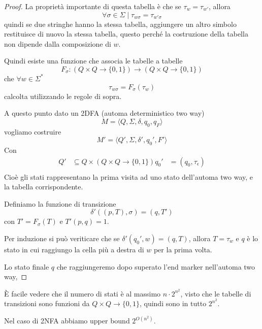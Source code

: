\documentclass[12pt]{article}
\begin{document}
\begin{proof}
	La proprietà importante di questa tabella è che se $\tau_w = \tau_{w'}$, allora
	$$\forall \sigma \in \Sigma \mid \tau_{w\sigma} = \tau_{w'\sigma} $$
	quindi se due stringhe hanno la stessa tabella, aggiungere un altro simbolo restituisce di nuovo la stessa tabella, questo perché la costruzione della tabella non dipende dalla composizione di $w$. %

	Quindi esiste una funzione che associa le tabelle a tabelle
	$$ F_\sigma : (Q \times Q \rightarrow \{0, 1\}) \rightarrow (Q \times Q \rightarrow \{0, 1\}) $$
	che $\forall w \in \Sigma^*$
	$$ \tau_{w\sigma} = F_\sigma(\tau_w) $$
	calcolta utilizzando le regole di sopra.

	A questo punto dato un 2DFA (automa deterministico two way)
	$$ M = \langle Q, \Sigma, \delta, q_0, q_F\rangle$$
	vogliamo costruire
	$$ M' = \langle Q', \Sigma, \delta', q_0', F' \rangle $$
	Con
	\begin{align*}
		Q' &\subseteq Q \times (Q \times Q \rightarrow \{0, 1\}) 
		q_0' &= (q_0, \tau_\epsilon ) \\
	\end{align*}
	Cioè gli stati rappresentano la prima visita ad uno stato dell'automa two way, e la tabella corrispondente.

	Definiamo la funzione di transizione
	$$ \delta'((p, T), \sigma) = (q, T') $$
	con $T' = F_\sigma(T)$ e $T'(p, q) = 1$.

	Per induzione si può veriticare che se $\delta'(q_0', w) = (q, T)$, allora $T = \tau_w$ e $q$ è lo stato in cui raggiungo la cella più a destra di $w$ per la prima volta.

	Lo stato finale $q$ che raggiungeremo dopo superato l'end marker nell'automa two way, 
\end{proof}
\`E facile vedere che il numero di stati è al massimo $n \cdot 2^{n^2}$, visto che le tabelle di transizioni sono funzioni da $Q \times Q \rightarrow \{0, 1\}$, quindi sono in tutto $2^{n^2}$.

Nel caso di 2NFA abbiamo upper bound $2^{O(n^2)}$.
\end{document}
